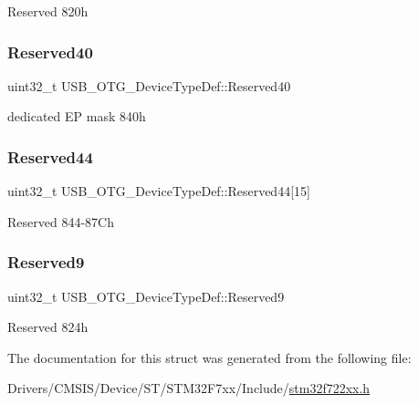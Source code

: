 Reserved 820h \mbox{\label{struct_u_s_b___o_t_g___device_type_def_a4356045c881b1f037c3016473e580679}} 
\subsubsection{\texorpdfstring{Reserved40}{Reserved40}}
{\footnotesize\ttfamily uint32\+\_\+t U\+S\+B\+\_\+\+O\+T\+G\+\_\+\+Device\+Type\+Def\+::\+Reserved40}

dedicated EP mask 840h \mbox{\label{struct_u_s_b___o_t_g___device_type_def_a6bb6a88a8d92f9cb65d104f40934844b}} 
\subsubsection{\texorpdfstring{Reserved44}{Reserved44}}
{\footnotesize\ttfamily uint32\+\_\+t U\+S\+B\+\_\+\+O\+T\+G\+\_\+\+Device\+Type\+Def\+::\+Reserved44\mbox{[}15\mbox{]}}

Reserved 844-\/87Ch \mbox{\label{struct_u_s_b___o_t_g___device_type_def_a7d7b3f7c72c92856e77d149c43200709}} 
\subsubsection{\texorpdfstring{Reserved9}{Reserved9}}
{\footnotesize\ttfamily uint32\+\_\+t U\+S\+B\+\_\+\+O\+T\+G\+\_\+\+Device\+Type\+Def\+::\+Reserved9}

Reserved 824h 

The documentation for this struct was generated from the following file\+:\begin{DoxyCompactItemize}
\item 
Drivers/\+C\+M\+S\+I\+S/\+Device/\+S\+T/\+S\+T\+M32\+F7xx/\+Include/\mbox{\hyperlink{stm32f722xx_8h}{stm32f722xx.\+h}}\end{DoxyCompactItemize}
